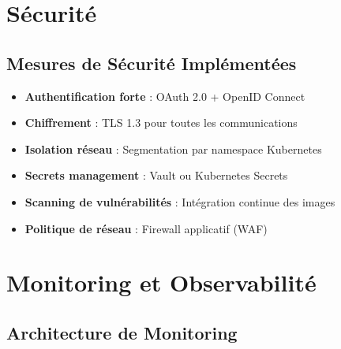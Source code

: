 \documentclass[12pt,a4paper]{article}
\begin{document}
\section{Sécurité}

\subsection{Mesures de Sécurité Implémentées}

\begin{itemize}
\item \textbf{Authentification forte} : OAuth 2.0 + OpenID Connect
\item \textbf{Chiffrement} : TLS 1.3 pour toutes les communications
\item \textbf{Isolation réseau} : Segmentation par namespace Kubernetes
\item \textbf{Secrets management} : Vault ou Kubernetes Secrets
\item \textbf{Scanning de vulnérabilités} : Intégration continue des images
\item \textbf{Politique de réseau} : Firewall applicatif (WAF)
\end{itemize}

\section{Monitoring et Observabilité}

\subsection{Architecture de Monitoring}
\end{document}
